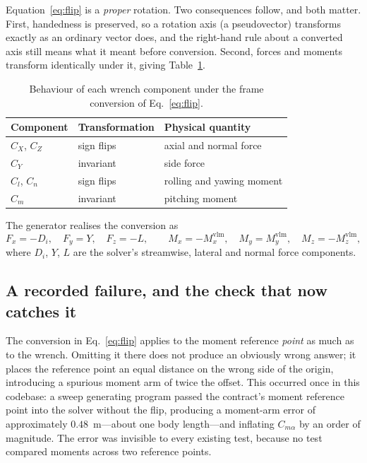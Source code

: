 \documentclass[11pt,a4paper]{article}
\begin{document}
Equation~\eqref{eq:flip} is a \emph{proper} rotation. Two consequences
follow, and both matter. First, handedness is preserved, so a rotation
axis (a pseudovector) transforms exactly as an ordinary vector does, and
the right-hand rule about a converted axis still means what it meant
before conversion. Second, forces and moments transform identically under
it, giving Table~\ref{tab:signs}.

\begin{table}[htbp]
\centering
\caption{Behaviour of each wrench component under the frame conversion of
Eq.~\eqref{eq:flip}.}
\label{tab:signs}
\begin{tabular}{@{}lll@{}}
\toprule
Component & Transformation & Physical quantity \\
\midrule
$C_X$, $C_Z$ & sign flips & axial and normal force \\
$C_Y$ & invariant & side force \\
$C_l$, $C_n$ & sign flips & rolling and yawing moment \\
$C_m$ & invariant & pitching moment \\
\bottomrule
\end{tabular}
\end{table}

The generator realises the conversion as
\begin{equation}
F_x = -D_i, \quad F_y = Y, \quad F_z = -L, \qquad
M_x = -M_x^{\mathrm{vlm}}, \quad M_y = M_y^{\mathrm{vlm}}, \quad
M_z = -M_z^{\mathrm{vlm}},
\label{eq:export}
\end{equation}
where $D_i$, $Y$, $L$ are the solver's streamwise, lateral and normal
force components.

\subsection{A recorded failure, and the check that now catches it}

The conversion in Eq.~\eqref{eq:flip} applies to the moment reference
\emph{point} as much as to the wrench. Omitting it there does not produce
an obviously wrong answer; it places the reference point an equal
distance on the wrong side of the origin, introducing a spurious moment
arm of twice the offset. This occurred once in this codebase: a sweep
generating program passed the contract's moment reference point into the solver
without the flip, producing a moment-arm error of approximately
$0.48$~m---about one body length---and inflating $C_{m\alpha}$ by an
order of magnitude. The error was invisible to every existing test,
because no test compared moments across two reference points.
\end{document}
